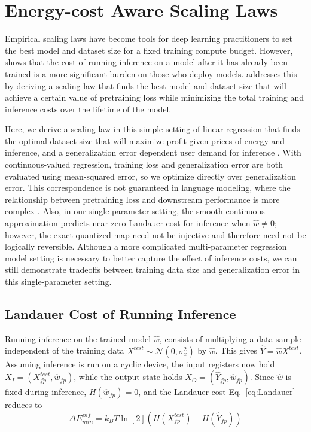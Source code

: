 \documentclass[12pt,onecolumn, margin=1in]{IEEEtran}
\newcommand{\paren}[1]{\left( #1 \right)}
\newcommand{\gauss}[2]{\mathcal{N}\paren{#1, #2}}
\newcommand{\wh}{\hat{w}}
\newcommand{\sigx}{\sigma_x}
\begin{document}
\section{Energy-cost Aware Scaling Laws}\label{sec:scaling}



Empirical scaling laws \cite{kaplan2020scalinglawsneurallanguage, hoffmann2022trainingcomputeoptimallargelanguage} have become tools for deep learning practitioners to set the best model and dataset size for a fixed training compute budget. 
However, \cite{patterson2021carbonemissionslargeneural} shows that the cost of running inference on a model after it has already been trained is a more significant burden on those who deploy models. 
\cite{sardana2025chinchillaoptimalaccountinginferencelanguage} addresses this by deriving a scaling law that finds the best model and dataset size that will achieve a certain value of pretraining loss while minimizing the total training and inference costs over the lifetime of the model. 

Here, we derive a scaling law in this simple setting of linear regression that finds the optimal dataset size that will maximize profit given prices of energy and inference, and a generalization error dependent user demand for inference \cite{sardana2025chinchillaoptimalaccountinginferencelanguage}. 
With continuous-valued regression, training loss and generalization error are both evaluated using mean-squared error, so we optimize directly over generalization error. 
This correspondence is not guaranteed in language modeling, where the relationship between pretraining loss and downstream performance is more complex \cite{schaeffer_are_2023, du_understanding_2025}. 
Also, in our single-parameter setting, the smooth continuous approximation predicts near-zero Landauer cost for inference when $\wh \neq 0$; however, the exact quantized map need not be injective and therefore need not be logically reversible. 
Although a more complicated multi-parameter regression model setting is necessary to better capture the effect of inference costs, we can still demonstrate tradeoffs between training data size and generalization error in this single-parameter setting.

\subsection{Landauer Cost of Running Inference}
Running inference on the trained model $\wh$, consists of multiplying a data sample independent of the training data $X^{test} \sim \gauss{0}{\sigx^2}$ by $\wh$. This gives $\hat{Y} = \wh X^{test}$. Assuming inference is run on a cyclic device, the input registers now hold $X_I = (X_{fp}^{test}, \wh_{fp})$, while the output state holds $X_O = (\hat Y_{fp}, \wh_{fp})$. Since $\wh$ is fixed during inference, $H(\wh_{fp}) = 0$, and the Landauer cost Eq.~\eqref{eq:Landauer} reduces to
\begin{equation}
    \Delta E_{min}^{inf} = k_BT \ln[2] (H(X^{test}_{fp}) - H(\hat Y_{fp}))
\end{equation}
\end{document}
